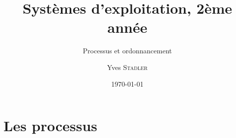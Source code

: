 
\title{Systèmes d'exploitation, 2ème année}
\subtitle{Processus et ordonnancement}

\author{Yves \textsc{Stadler}}

\date{\today}




\begin{frame}
\titlepage
\end{frame}

\def\sectitle{Les processus}
\section{\sectitle}

